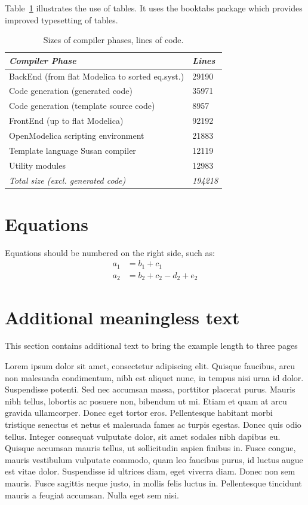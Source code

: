 \documentclass[11pt,a4paper,twocolumn]{article}
\begin{document}
Table~\ref{tab:extab} illustrates the use of tables. It uses the
booktabs package which provides improved typesetting of tables. 
\begin{table}[htbp]
  \caption{Sizes of compiler phases, lines of code.}
  \label{tab:extab}
  \centering
  \begin{tabular}{p{6cm}l} \toprule 
      \emph{Compiler Phase} & \emph{Lines} \\
      \midrule 
      BackEnd (from flat Modelica to sorted eq.syst.) & 29190 \\
      Code generation (generated code) & 35971 \\
      Code generation (template source code) & 8957 \\
      FrontEnd (up to flat Modelica) & 92192 \\
      OpenModelica scripting environment & 21883 \\
      Template language Susan compiler & 12119 \\
      Utility modules & 12983 \\
      \emph{Total size (excl. generated code)} & \emph{194218} \\
      \bottomrule
  \end{tabular}
\end{table}

\section{Equations}
Equations should be numbered on the right side, such as:
\begin{align}
a_1& =b_1+c_1\\
a_2& =b_2+c_2-d_2+e_2
\end{align}

\section{Additional meaningless text}
This section contains additional text to bring the example length to three pages



Lorem ipsum dolor sit amet, consectetur adipiscing elit. Quisque faucibus, arcu non malesuada condimentum, nibh est aliquet nunc, in tempus nisi urna id dolor. Suspendisse potenti. Sed nec accumsan massa, porttitor placerat purus. Mauris nibh tellus, lobortis ac posuere non, bibendum ut mi. Etiam et quam at arcu gravida ullamcorper. Donec eget tortor eros. Pellentesque habitant morbi tristique senectus et netus et malesuada fames ac turpis egestas. Donec quis odio tellus. Integer consequat vulputate dolor, sit amet sodales nibh dapibus eu. Quisque accumsan mauris tellus, ut sollicitudin sapien finibus in. Fusce congue, mauris vestibulum vulputate commodo, quam leo faucibus purus, id luctus augue est vitae dolor. Suspendisse id ultrices diam, eget viverra diam. Donec non sem mauris. Fusce sagittis neque justo, in mollis felis luctus in. Pellentesque tincidunt mauris a feugiat accumsan. Nulla eget sem nisi.
\end{document}
